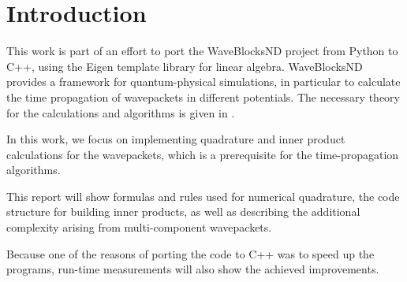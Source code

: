 \section{Introduction}

This work is part of an effort to port the WaveBlocksND project
\cite{waveblocksnd} from Python to C++, using the Eigen template library
\cite{eigenweb} for linear algebra.
WaveBlocksND provides a framework for quantum-physical simulations, in
particular to calculate the time propagation of wavepackets in different
potentials.
The necessary theory for the calculations and algorithms is given in
\cite{B_master_thesis}.

In this work, we focus on implementing quadrature and inner product calculations
for the wavepackets, which is a prerequisite for the time-propagation
algorithms.

This report will show formulas and rules used for numerical quadrature,
the code structure for building inner products, as well as describing the
additional complexity arising from multi-component wavepackets.

Because one of the reasons of porting the code to C++ was to speed up the
programs, run-time measurements will also show the achieved improvements.
